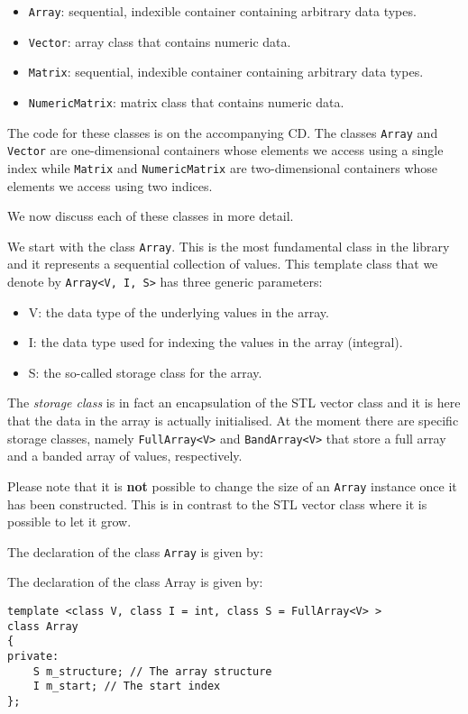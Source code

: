 \begin{itemize}
	\item \texttt{Array}: sequential, indexible container containing arbitrary data types.
	\item \texttt{Vector}: array class that contains numeric data.
	\item \texttt{Matrix}: sequential, indexible container containing arbitrary data types.
	\item \texttt{NumericMatrix}: matrix class that contains numeric data.
\end{itemize}
The code for these classes is on the accompanying CD. The classes \texttt{Array} and \texttt{Vector} are one-dimensional containers whose elements we access using a single index while \texttt{Matrix} and \texttt{NumericMatrix} are two-dimensional containers whose elements we access using two indices.

We now discuss each of these classes in more detail.

We start with the class \texttt{Array}. This is the most fundamental class in the library and it
represents a sequential collection of values. This template class that we denote by \texttt{Array<V, I, S>} has three generic parameters:
\begin{itemize}
	\item V: the data type of the underlying values in the array.
	\item I: the data type used for indexing the values in the array (integral).
	\item S: the so-called storage class for the array.
\end{itemize}
The \textit{storage class} is in fact an encapsulation of the STL vector class and it is here that the data in the array is actually initialised. At the moment there are specific storage classes, namely \texttt{FullArray<V>} and \texttt{BandArray<V>} that store a full array and a banded array of values, respectively.

Please note that it is \textbf{not} possible to change the size of an \texttt{Array} instance once it has been constructed. This is in contrast to the STL vector class where it is possible to let it grow.

The declaration of the class \texttt{Array} is given by:

The declaration of the class Array is given by:
\begin{lstlisting}
template <class V, class I = int, class S = FullArray<V> >
class Array
{
private:
	S m_structure; // The array structure
	I m_start; // The start index
};
\end{lstlisting}

